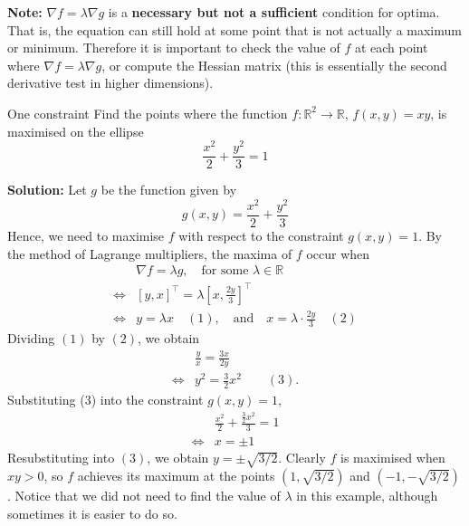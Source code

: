 \documentclass[11pt]{article}
\newcommand{\R}{\mathbb{R}}
\begin{document}
\smallskip
	\noindent \textbf{Note:} \( \nabla f = \lambda\nabla g \) is a \textbf{necessary but not a sufficient} condition for optima. That is, the equation can still hold at some point that is not actually a maximum or minimum. Therefore it is important to check the value of \( f \) at each point where \( \nabla f = \lambda\nabla g \), or compute the Hessian matrix (this is essentially the second derivative test in higher dimensions). 
	\begin{example}{One constraint}{}
			Find the points where the function \( f:\R^2\to\R \), \( f(x, y) = xy \), is maximised on the ellipse
			\[	\frac{x^2}{2} + \frac{y^2}{3} = 1
			\]
		\end{example}
	\noindent \textbf{Solution:} Let \( g \) be the function given by
	\[	g(x, y) = \frac{x^2}{2} + \frac{y^2}{3}
	\]
	Hence, we need to maximise \( f \) with respect to the constraint \( g(x,y) = 1 \).
	By the method of Lagrange multipliers, the maxima of \( f \) occur when 
	\begin{align*}
		     &\nabla f = \lambda g, \quad\text{for some }\lambda\in\R\\
		\iff & \left[y, x\right]^{\top} = \lambda \left[x, \frac{2y}{3}\right]^{\top} \\
		\iff & y = \lambda x\quad (1), \quad\text{and}\quad x = \lambda\cdot\frac{2y}{3} \quad (2)
	\end{align*}
	Dividing \( (1) \) by \( (2) \), we obtain
	\begin{align*}
		 	 & \frac{y}{x} = \frac{3x}{2y} \\
		\iff & y^2 = \frac{3}{2}x^2\qquad (3).
	\end{align*}
	Substituting (3) into the constraint \( g(x,y) = 1 \), 
	\begin{align*}
			 & \frac{x^2}{2} + \frac{\frac{3}{2} x^2}{3} = 1 \\
		\iff & x = \pm 1
	\end{align*}
	Resubstituting into \( (3) \), we obtain \( y = \pm\sqrt{3/2} \). Clearly \( f \) is maximised when \( xy >0 \), so \( f \) achieves its maximum at the points \( (1, \sqrt{3/2}) \) and \((-1, -\sqrt{3/2})  \). Notice that we did not need to find the value of \( \lambda \) in this example, although sometimes it is easier to do so.\\\\
\end{document}
